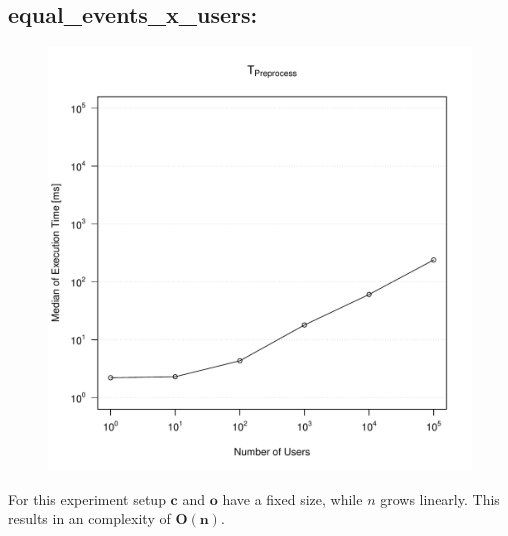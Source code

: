 \documentclass[10pt,a4paper]{article}
\begin{document}
	\subsection{equal\_events\_x\_users:}
	\begin{figure}[H]
		\centering
		\includegraphics[scale=0.7]{graphics/TPreprocess_median_equal_events.pdf}
	\end{figure}
	For this experiment setup $\mathbf{c}$ and $\mathbf{o}$ have a fixed size, while $n$ grows linearly. This results in an complexity of $\mathbf{O(n)}$.
	
\end{document}
